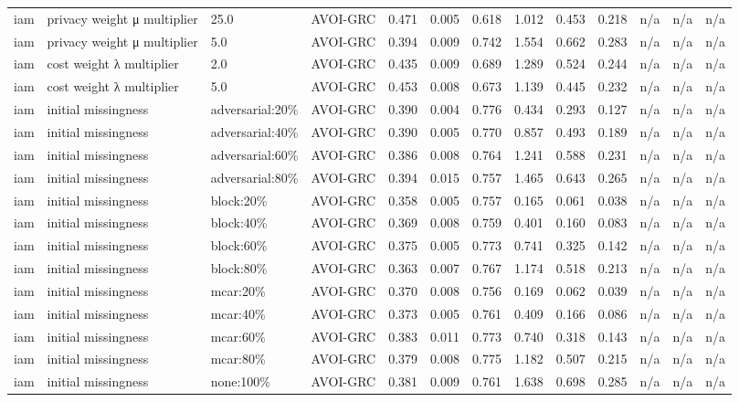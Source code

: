 \begin{table}[!ht]
{\begin{tabular}{lllllllllllll}
iam & privacy weight μ multiplier & 25.0 & AVOI-GRC & 0.471 & 0.005 & 0.618 & 1.012 & 0.453 & 0.218 & n/a & n/a & n/a \\
iam & privacy weight μ multiplier & 5.0 & AVOI-GRC & 0.394 & 0.009 & 0.742 & 1.554 & 0.662 & 0.283 & n/a & n/a & n/a \\
iam & cost weight λ multiplier & 2.0 & AVOI-GRC & 0.435 & 0.009 & 0.689 & 1.289 & 0.524 & 0.244 & n/a & n/a & n/a \\
iam & cost weight λ multiplier & 5.0 & AVOI-GRC & 0.453 & 0.008 & 0.673 & 1.139 & 0.445 & 0.232 & n/a & n/a & n/a \\
iam & initial missingness & adversarial:20\% & AVOI-GRC & 0.390 & 0.004 & 0.776 & 0.434 & 0.293 & 0.127 & n/a & n/a & n/a \\
iam & initial missingness & adversarial:40\% & AVOI-GRC & 0.390 & 0.005 & 0.770 & 0.857 & 0.493 & 0.189 & n/a & n/a & n/a \\
iam & initial missingness & adversarial:60\% & AVOI-GRC & 0.386 & 0.008 & 0.764 & 1.241 & 0.588 & 0.231 & n/a & n/a & n/a \\
iam & initial missingness & adversarial:80\% & AVOI-GRC & 0.394 & 0.015 & 0.757 & 1.465 & 0.643 & 0.265 & n/a & n/a & n/a \\
iam & initial missingness & block:20\% & AVOI-GRC & 0.358 & 0.005 & 0.757 & 0.165 & 0.061 & 0.038 & n/a & n/a & n/a \\
iam & initial missingness & block:40\% & AVOI-GRC & 0.369 & 0.008 & 0.759 & 0.401 & 0.160 & 0.083 & n/a & n/a & n/a \\
iam & initial missingness & block:60\% & AVOI-GRC & 0.375 & 0.005 & 0.773 & 0.741 & 0.325 & 0.142 & n/a & n/a & n/a \\
iam & initial missingness & block:80\% & AVOI-GRC & 0.363 & 0.007 & 0.767 & 1.174 & 0.518 & 0.213 & n/a & n/a & n/a \\
iam & initial missingness & mcar:20\% & AVOI-GRC & 0.370 & 0.008 & 0.756 & 0.169 & 0.062 & 0.039 & n/a & n/a & n/a \\
iam & initial missingness & mcar:40\% & AVOI-GRC & 0.373 & 0.005 & 0.761 & 0.409 & 0.166 & 0.086 & n/a & n/a & n/a \\
iam & initial missingness & mcar:60\% & AVOI-GRC & 0.383 & 0.011 & 0.773 & 0.740 & 0.318 & 0.143 & n/a & n/a & n/a \\
iam & initial missingness & mcar:80\% & AVOI-GRC & 0.379 & 0.008 & 0.775 & 1.182 & 0.507 & 0.215 & n/a & n/a & n/a \\
iam & initial missingness & none:100\% & AVOI-GRC & 0.381 & 0.009 & 0.761 & 1.638 & 0.698 & 0.285 & n/a & n/a & n/a \\

\end{tabular}}
\end{table}
